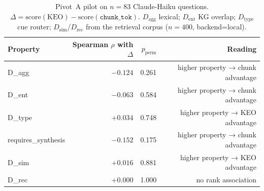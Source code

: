 \begin{table}[t]
\centering
\small
\begin{tabular}{lrrr}
\toprule
Property & Spearman $\rho$ with $\Delta$ & $p_{\mathrm{perm}}$ & Reading \\
\midrule
D\_agg & $-0.124$ & 0.261 & higher property → chunk advantage \\
D\_ent & $-0.063$ & 0.584 & higher property → chunk advantage \\
D\_type & $+0.034$ & 0.748 & higher property → KEO advantage \\
requires\_synthesis & $-0.152$ & 0.175 & higher property → chunk advantage \\
D\_sim & $+0.016$ & 0.881 & higher property → KEO advantage \\
D\_rec & $+0.000$ & 1.000 & no rank association \\
\bottomrule
\end{tabular}
\caption{Pivot~A pilot on $n=83$ Claude-Haiku questions. $\Delta = \mathrm{score}(\mathrm{KEO}) - \mathrm{score}(\texttt{chunk\_tok})$. $D_{\mathrm{agg}}$ lexical; $D_{\mathrm{ent}}$ KG overlap; $D_{\mathrm{type}}$ cue router; $D_{\mathrm{sim}}$/$D_{\mathrm{rec}}$ from the retrieval corpus ($n=400$, backend=local).}
\label{tab:dispersion-pilot}
\end{table}
